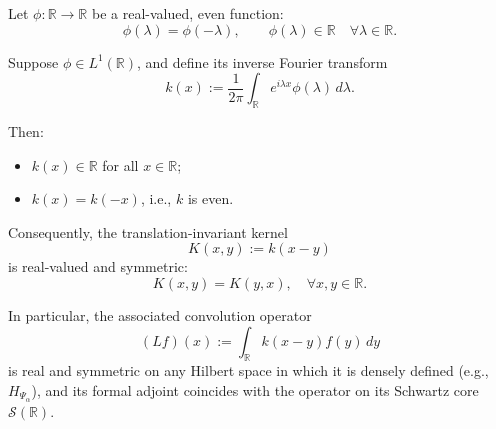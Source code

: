 \begin{lemma}
\label{lem:fourier-symmetry-reflection}
Let \( \phi \colon \mathbb{R} \to \mathbb{R} \) be a real-valued, even function:
\[
\phi(\lambda) = \phi(-\lambda), \qquad \phi(\lambda) \in \mathbb{R} \quad \forall \lambda \in \mathbb{R}.
\]

Suppose \( \phi \in L^1(\mathbb{R}) \), and define its inverse Fourier transform
\[
k(x) := \frac{1}{2\pi} \int_{\mathbb{R}} e^{i \lambda x} \phi(\lambda)\, d\lambda.
\]

Then:
\begin{itemize}
    \item \( k(x) \in \mathbb{R} \) for all \( x \in \mathbb{R} \);
    \item \( k(x) = k(-x) \), i.e., \( k \) is even.
\end{itemize}

Consequently, the translation-invariant kernel
\[
K(x,y) := k(x - y)
\]
is real-valued and symmetric:
\[
K(x,y) = K(y,x), \quad \forall x, y \in \mathbb{R}.
\]

In particular, the associated convolution operator
\[
(Lf)(x) := \int_{\mathbb{R}} k(x - y) f(y)\, dy
\]
is real and symmetric on any Hilbert space in which it is densely defined (e.g., \( H_{\Psi_\alpha} \)), and its formal adjoint coincides with the operator on its Schwartz core \( \mathcal{S}(\mathbb{R}) \).
\end{lemma}
